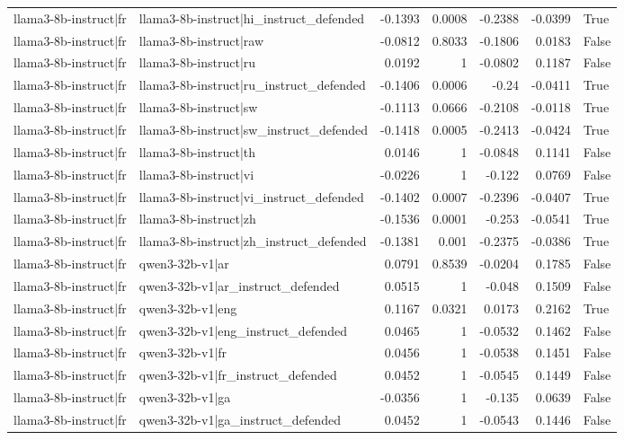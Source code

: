 \begin{table}
\begin{tabular}{l l r r r r l}
llama3-8b-instruct|fr & llama3-8b-instruct|hi_instruct_defended & -0.1393 & 0.0008 & -0.2388 & -0.0399 & True \\
llama3-8b-instruct|fr & llama3-8b-instruct|raw & -0.0812 & 0.8033 & -0.1806 & 0.0183 & False \\
llama3-8b-instruct|fr & llama3-8b-instruct|ru & 0.0192 & 1 & -0.0802 & 0.1187 & False \\
llama3-8b-instruct|fr & llama3-8b-instruct|ru_instruct_defended & -0.1406 & 0.0006 & -0.24 & -0.0411 & True \\
llama3-8b-instruct|fr & llama3-8b-instruct|sw & -0.1113 & 0.0666 & -0.2108 & -0.0118 & True \\
llama3-8b-instruct|fr & llama3-8b-instruct|sw_instruct_defended & -0.1418 & 0.0005 & -0.2413 & -0.0424 & True \\
llama3-8b-instruct|fr & llama3-8b-instruct|th & 0.0146 & 1 & -0.0848 & 0.1141 & False \\
llama3-8b-instruct|fr & llama3-8b-instruct|vi & -0.0226 & 1 & -0.122 & 0.0769 & False \\
llama3-8b-instruct|fr & llama3-8b-instruct|vi_instruct_defended & -0.1402 & 0.0007 & -0.2396 & -0.0407 & True \\
llama3-8b-instruct|fr & llama3-8b-instruct|zh & -0.1536 & 0.0001 & -0.253 & -0.0541 & True \\
llama3-8b-instruct|fr & llama3-8b-instruct|zh_instruct_defended & -0.1381 & 0.001 & -0.2375 & -0.0386 & True \\
llama3-8b-instruct|fr & qwen3-32b-v1|ar & 0.0791 & 0.8539 & -0.0204 & 0.1785 & False \\
llama3-8b-instruct|fr & qwen3-32b-v1|ar_instruct_defended & 0.0515 & 1 & -0.048 & 0.1509 & False \\
llama3-8b-instruct|fr & qwen3-32b-v1|eng & 0.1167 & 0.0321 & 0.0173 & 0.2162 & True \\
llama3-8b-instruct|fr & qwen3-32b-v1|eng_instruct_defended & 0.0465 & 1 & -0.0532 & 0.1462 & False \\
llama3-8b-instruct|fr & qwen3-32b-v1|fr & 0.0456 & 1 & -0.0538 & 0.1451 & False \\
llama3-8b-instruct|fr & qwen3-32b-v1|fr_instruct_defended & 0.0452 & 1 & -0.0545 & 0.1449 & False \\
llama3-8b-instruct|fr & qwen3-32b-v1|ga & -0.0356 & 1 & -0.135 & 0.0639 & False \\
llama3-8b-instruct|fr & qwen3-32b-v1|ga_instruct_defended & 0.0452 & 1 & -0.0543 & 0.1446 & False \\

\end{tabular}
\end{table}
